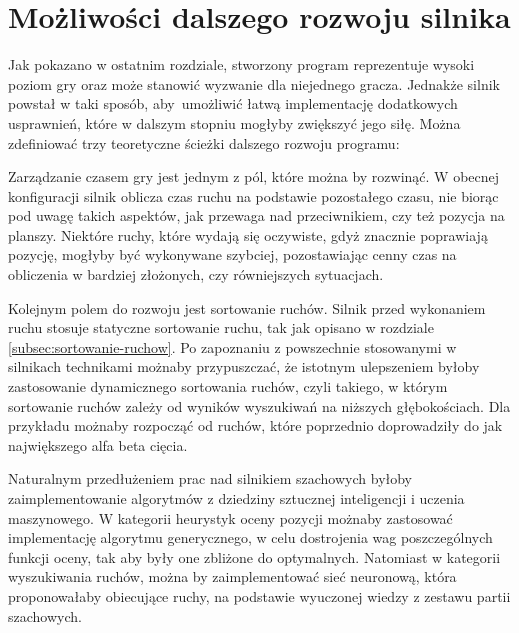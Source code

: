 \section {Możliwości dalszego rozwoju silnika}
\label {sec: dalszy-rozwoj}

Jak pokazano w ostatnim rozdziale, stworzony program reprezentuje wysoki poziom gry oraz może stanowić wyzwanie dla niejednego gracza.
Jednakże silnik powstał w taki sposób, aby~umożliwić łatwą implementację dodatkowych usprawnień, które w dalszym stopniu mogłyby zwiększyć jego siłę.
Można zdefiniować trzy teoretyczne ścieżki dalszego rozwoju programu:

Zarządzanie czasem gry jest jednym z pól, które można by rozwinąć.
W obecnej konfiguracji silnik oblicza czas ruchu na podstawie pozostałego czasu, nie biorąc pod uwagę takich aspektów, jak przewaga nad przeciwnikiem, czy też pozycja na planszy.
Niektóre ruchy, które wydają się oczywiste, gdyż znacznie poprawiają pozycję, mogłyby być wykonywane szybciej, pozostawiając cenny czas na obliczenia w bardziej złożonych, czy równiejszych sytuacjach.

Kolejnym polem do rozwoju jest sortowanie ruchów.
Silnik przed wykonaniem ruchu stosuje statyczne sortowanie ruchu, tak jak opisano w rozdziale \ref {subsec:sortowanie-ruchow}.
Po zapoznaniu z powszechnie stosowanymi w silnikach technikami możnaby przypuszczać, że istotnym ulepszeniem byłoby zastosowanie dynamicznego sortowania ruchów, czyli takiego, w którym sortowanie ruchów zależy od wyników wyszukiwań na niższych głębokościach.
Dla przykładu możnaby rozpocząć od ruchów, które poprzednio doprowadziły do jak największego alfa beta cięcia.

Naturalnym przedłużeniem prac nad silnikiem szachowych byłoby zaimplementowanie algorytmów z dziedziny sztucznej inteligencji i uczenia maszynowego.
W kategorii heurystyk oceny pozycji możnaby zastosować implementację algorytmu generycznego, w celu dostrojenia wag poszczególnych funkcji oceny, tak aby były one zbliżone do optymalnych.
Natomiast w kategorii wyszukiwania ruchów, można by zaimplementować sieć neuronową, która proponowałaby obiecujące ruchy, na podstawie wyuczonej wiedzy z zestawu partii szachowych.


